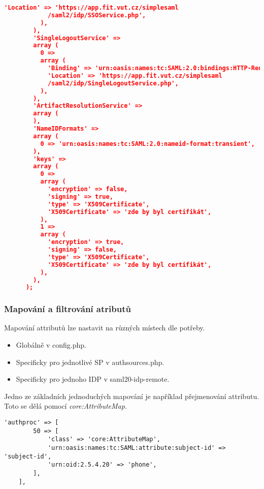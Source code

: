 \begin{lstlisting}[language=json]
            'Location' => 'https://app.fit.vut.cz/simplesaml
            /saml2/idp/SSOService.php',
          ),
        ),
        'SingleLogoutService' =>
        array (
          0 =>
          array (
            'Binding' => 'urn:oasis:names:tc:SAML:2.0:bindings:HTTP-Redirect',
            'Location' => 'https://app.fit.vut.cz/simplesaml
            /saml2/idp/SingleLogoutService.php',
          ),
        ),
        'ArtifactResolutionService' =>
        array (
        ),
        'NameIDFormats' =>
        array (
          0 => 'urn:oasis:names:tc:SAML:2.0:nameid-format:transient',
        ),
        'keys' =>
        array (
          0 =>
          array (
            'encryption' => false,
            'signing' => true,
            'type' => 'X509Certificate',
            'X509Certificate' => 'zde by byl certifikát',
          ),
          1 =>
          array (
            'encryption' => true,
            'signing' => false,
            'type' => 'X509Certificate',
            'X509Certificate' => 'zde by byl certifikát',
          ),
        ),
      );

\end{lstlisting}

\subsubsection{Mapování a filtrování atributů}\label{attributemap_ssphp} %
Mapování attributů lze nastavit na různých místech dle potřeby.

\begin{itemize}

    \item Globálně v config.php.
    \item Specificky pro jednotlivé SP v authsources.php.
    \item Specificky pro jednoho IDP v saml20-idp-remote.

\end{itemize}

Jedno ze základních jednoduchých mapování je například přejmenování attributu. Toto se dělá pomocí \emph{core:AttributeMap}.

\begin{lstlisting}[json]
    'authproc' => [
        50 => [
            'class' => 'core:AttributeMap',
            'urn:oasis:names:tc:SAML:attribute:subject-id' => 'subject-id',
            'urn:oid:2.5.4.20' => 'phone',
        ],
    ],
\end{lstlisting}

